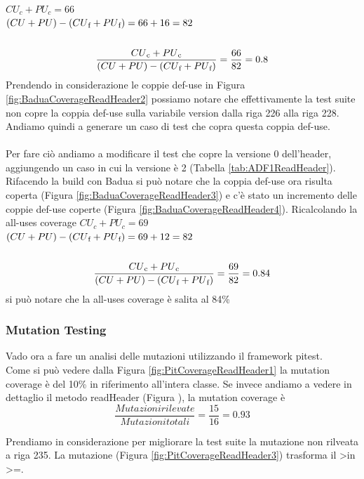 \documentclass[12pt, a4paper]{article}
\begin{document}
\(CU_c + PU_c = 66\) \\
\( (CU + PU) - (CU\textsubscript{f} + PU\textsubscript{f}) = 66 + 16 = 82\) \\ \\
\[\frac{{CU\textsubscript{c} + PU\textsubscript{c}}}{{(CU + PU) - (CU\textsubscript{f} + PU\textsubscript{f})}} = \frac{{66}}{{82}} = 0.8\]
Prendendo in considerazione le coppie def-use in Figura \ref{fig:BaduaCoverageReadHeader2} possiamo notare che
effettivamente la test suite non copre la coppia def-use sulla variabile version dalla riga 226 alla riga 228.
Andiamo quindi a generare un caso di test che copra questa coppia def-use. \\ \\
Per fare ciò andiamo a modificare il test che copre la versione 0 dell'header, aggiungendo un caso in cui la versione
è 2 (Tabella \ref{tab:ADF1ReadHeader}).  Rifacendo la build con Badua si può notare che la coppia def-use ora risulta coperta (Figura \ref{fig:BaduaCoverageReadHeader3})
e c'è stato un incremento delle coppie def-use coperte (Figura \ref{fig:BaduaCoverageReadHeader4}). Ricalcolando
la all-uses coverage 
\(CU_c + PU_c = 69\) \\
\( (CU + PU) - (CU\textsubscript{f} + PU\textsubscript{f}) = 69 + 12 = 82\) \\ \\
\[\frac{{CU\textsubscript{c} + PU\textsubscript{c}}}{{(CU + PU) - (CU\textsubscript{f} + PU\textsubscript{f})}} = \frac{{69}}{{82}} = 0.84\]
si può notare che la all-uses coverage è salita al 84\% \\

\subsubsection{Mutation Testing}
Vado ora a fare un analisi delle mutazioni utilizzando il framework pitest. \\
Come si può vedere dalla Figura \ref{fig:PitCoverageReadHeader1} la mutation coverage è del 10\% in riferimento all'intera classe.
Se invece andiamo a vedere in dettaglio il metodo readHeader (Figura ), la mutation coverage è 
\[\frac{{Mutazioni rilevate}}{{Mutazioni totali}} = \frac{{15}}{{16}} = 0.93\]



Prendiamo in considerazione per migliorare la test suite la mutazione non rilveata a riga 235. 
La mutazione (Figura \ref{fig:PitCoverageReadHeader3}) trasforma il \textgreater in \textgreater=.
\end{document}
